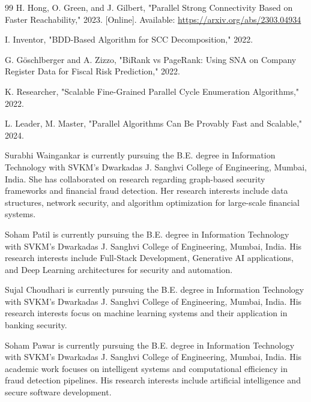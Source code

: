 \documentclass[lettersize,journal]{IEEEtran}
\begin{document}
\begin{thebibliography}{99}
 H. Hong, O. Green, and J. Gilbert, "Parallel Strong Connectivity Based on Faster Reachability," 2023. [Online]. Available: \url{https://arxiv.org/abs/2303.04934}

 I. Inventor, "BDD-Based Algorithm for SCC Decomposition," 2022.

 G. Göschlberger and A. Zizzo, "BiRank vs PageRank: Using SNA on Company Register Data for Fiscal Risk Prediction," 2022.

 K. Researcher, "Scalable Fine-Grained Parallel Cycle Enumeration Algorithms," 2022.

 L. Leader, M. Master, "Parallel Algorithms Can Be Provably Fast and Scalable," 2024.

\end{thebibliography}


\begin{IEEEbiographynophoto}{Surabhi Waingankar}
is currently pursuing the B.E. degree in Information Technology with SVKM's Dwarkadas J. Sanghvi College of Engineering, Mumbai, India. She has collaborated on research regarding graph-based security frameworks and financial fraud detection. Her research interests include data structures, network security, and algorithm optimization for large-scale financial systems.
\end{IEEEbiographynophoto}

\begin{IEEEbiographynophoto}{Soham Patil}
is currently pursuing the B.E. degree in Information Technology with SVKM's Dwarkadas J. Sanghvi College of Engineering, Mumbai, India. His research interests include Full-Stack Development, Generative AI applications, and Deep Learning architectures for security and automation.
\end{IEEEbiographynophoto}

\begin{IEEEbiographynophoto}{Sujal Choudhari}
is currently pursuing the B.E. degree in Information Technology with SVKM's Dwarkadas J. Sanghvi College of Engineering, Mumbai, India. His research interests focus on machine learning systems and their application in banking security.
\end{IEEEbiographynophoto}

\begin{IEEEbiographynophoto}{Soham Pawar}
is currently pursuing the B.E. degree in Information Technology with SVKM's Dwarkadas J. Sanghvi College of Engineering, Mumbai, India. His academic work focuses on intelligent systems and computational efficiency in fraud detection pipelines. His research interests include artificial intelligence and secure software development.
\end{IEEEbiographynophoto}
\end{document}
